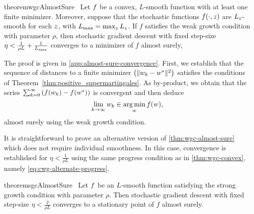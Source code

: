 \begin{restatable}{theorem}{wgcAlmostSure}~\label{thm:wgc-almost-sure}
    Let \( f \) be a convex, \( L \)-smooth function with at least one finite minimizer.
    Moreover, suppose that the stochastic functions \( f(\cdot, z) \) are \( L_z \)-smooth for each \( z \), with \( L_{\text{max}} = \max_z L_z \).
    If \( f \) satisfies the weak growth condition with parameter \( \rho \), then stochastic gradient descent with fixed step-size \( \eta < \frac{1}{\rho L} + \frac{1}{L_{\text{max}}} \) converges to a minimizer of \( f \) almost surely,
\end{restatable}

The proof is given in \autoref{app:almost-sure-convergence}.
First, we establish that the sequence of distances to a finite minimizer \( \left(\|w_k - w^*\|^2\right) \) satisfies the conditions of Theorem~\ref{thm:positive_supermartingales}.
As by-product, we obtain that the series \( \sum_{k=0}^{\infty} \left(f(w_k) - f(w^*)\right) \) is convergent and then deduce
\[ \lim_{k\rightarrow\infty} w_k \in \mathop{\rm arg\,min}_w f(w), \] 
almost surely using the weak growth condition.

It is straightforward to prove an alternative version of \autoref{thm:wgc-almost-sure} which does not require individual smoothness.
In this case, convergence is established for \( \eta < \frac{1}{\rho L} \) using the same progress condition as in \autoref{thm:wgc-convex}, namely \autoref{eq:cwg-alternate-progress}.

\begin{restatable}{theorem}{sgcAlmostSure}~\label{thm:sgc-almost-sure}
    Let \( f \) be an \( L \)-smooth function satisfying the strong growth condition with parameter \(\rho \).
    Then stochastic gradient descent with fixed step-size \(\eta < \frac{2}{\rho L} \) converges to a stationary point of \( f \) almost surely.
\end{restatable}

\endinput

